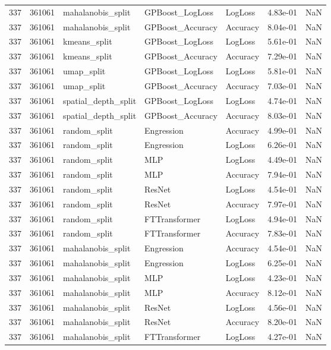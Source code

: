 \begin{tabular}{rrlllrr}
337 & 361061 & mahalanobis\_split & GPBoost\_LogLoss & LogLoss & 4.83e-01 & NaN \\
337 & 361061 & mahalanobis\_split & GPBoost\_Accuracy & Accuracy & 8.04e-01 & NaN \\
337 & 361061 & kmeans\_split & GPBoost\_LogLoss & LogLoss & 5.61e-01 & NaN \\
337 & 361061 & kmeans\_split & GPBoost\_Accuracy & Accuracy & 7.29e-01 & NaN \\
337 & 361061 & umap\_split & GPBoost\_LogLoss & LogLoss & 5.81e-01 & NaN \\
337 & 361061 & umap\_split & GPBoost\_Accuracy & Accuracy & 7.03e-01 & NaN \\
337 & 361061 & spatial\_depth\_split & GPBoost\_LogLoss & LogLoss & 4.74e-01 & NaN \\
337 & 361061 & spatial\_depth\_split & GPBoost\_Accuracy & Accuracy & 8.03e-01 & NaN \\
337 & 361061 & random\_split & Engression & Accuracy & 4.99e-01 & NaN \\
337 & 361061 & random\_split & Engression & LogLoss & 6.26e-01 & NaN \\
337 & 361061 & random\_split & MLP & LogLoss & 4.49e-01 & NaN \\
337 & 361061 & random\_split & MLP & Accuracy & 7.94e-01 & NaN \\
337 & 361061 & random\_split & ResNet & LogLoss & 4.54e-01 & NaN \\
337 & 361061 & random\_split & ResNet & Accuracy & 7.97e-01 & NaN \\
337 & 361061 & random\_split & FTTransformer & LogLoss & 4.94e-01 & NaN \\
337 & 361061 & random\_split & FTTransformer & Accuracy & 7.83e-01 & NaN \\
337 & 361061 & mahalanobis\_split & Engression & Accuracy & 4.54e-01 & NaN \\
337 & 361061 & mahalanobis\_split & Engression & LogLoss & 6.25e-01 & NaN \\
337 & 361061 & mahalanobis\_split & MLP & LogLoss & 4.23e-01 & NaN \\
337 & 361061 & mahalanobis\_split & MLP & Accuracy & 8.12e-01 & NaN \\
337 & 361061 & mahalanobis\_split & ResNet & LogLoss & 4.56e-01 & NaN \\
337 & 361061 & mahalanobis\_split & ResNet & Accuracy & 8.20e-01 & NaN \\
337 & 361061 & mahalanobis\_split & FTTransformer & LogLoss & 4.27e-01 & NaN \\

\end{tabular}
